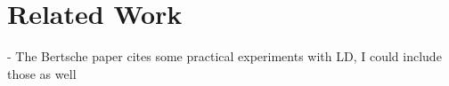 
\chapter{Related Work}
\label{chap:related_work}



- The Bertsche paper cites some practical experiments with LD, I could include those as well
